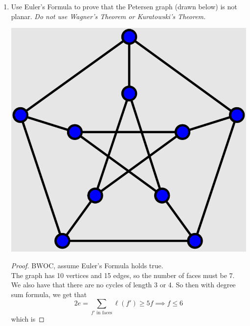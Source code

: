 \documentclass[12pt]{article}
\begin{document}
\begin{enumerate}
\medskip 
\item Use Euler's Formula to prove that the Petersen graph (drawn below) is not planar.
{\em Do not use Wagner's Theorem or Kuratowski's Theorem.}
\begin{center}
\includegraphics[scale=.1]{petersen.png}
\end{center}
\begin{proof}
	BWOC, assume Euler's Formula holds true.\\
	The graph has 10 vertices and 15 edges, so the number of faces must be 7. We also have that there are no cycles of length 3 or 4. So then with degree sum formula, we get that \[2e = \sum_{f'\text{ in faces}} \ell(f') \geq 5f \implies f \leq 6\]
	which is\contra
\end{proof}
\end{enumerate}
\end{document}

